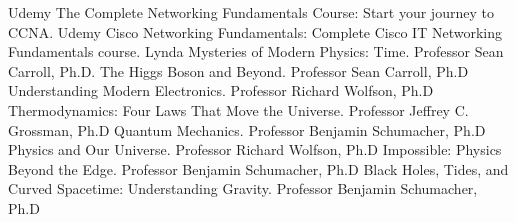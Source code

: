 \documentclass[]{friggeri-cv} %
\begin{document}
\begin{entrylist}
{Udemy}
{\vspace{-3mm}}
\entry
{}
{The Complete Networking Fundamentals Course: {\normalfont\small{Start your journey to CCNA.}}}
{Udemy}
{\vspace{-3mm}}
\entry
{}
{Cisco Networking Fundamentals: {\normalfont\small{Complete Cisco IT Networking Fundamentals course.}}}
{Lynda}
{\vspace{-3mm}}
\entry
{}
{Mysteries of Modern Physics: Time{\normalfont\small{.}}}
{Professor Sean Carroll, Ph.D.}
{\vspace{-3mm}}
\entry
{}
{The Higgs Boson and Beyond{\normalfont\small{.}}}
{Professor Sean Carroll, Ph.D}
{\vspace{-3mm}}
\entry
{}
{Understanding Modern Electronics{\normalfont\small{.}}}
{Professor Richard Wolfson, Ph.D}
{\vspace{-3mm}}
\entry
{}
{Thermodynamics: Four Laws That Move the Universe{\normalfont\small{.}}}
{Professor Jeffrey C. Grossman, Ph.D}
{\vspace{-3mm}}
\entry
{}
{Quantum Mechanics{\normalfont\small{.}}}
{Professor Benjamin Schumacher, Ph.D}
{\vspace{-3mm}}
\entry
{}
{Physics and Our Universe{\normalfont\small{.}}}
{Professor Richard Wolfson, Ph.D}
{\vspace{-3mm}}
\entry
{}
{Impossible: Physics Beyond the Edge{\normalfont\small{.}}}
{Professor Benjamin Schumacher, Ph.D}
{\vspace{-3mm}}
\entry
{}
{Black Holes, Tides, and Curved Spacetime: Understanding Gravity{\normalfont\small{.}}}
{Professor Benjamin Schumacher, Ph.D}
{\vspace{-3mm}}
\end{entrylist}

\clearpage

\end{document}
